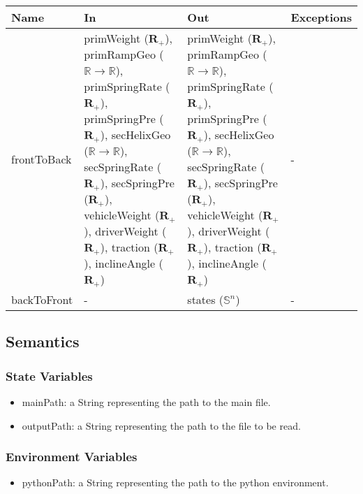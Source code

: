 \documentclass[12pt, titlepage]{article}
\begin{document}
\begin{center}
\begin{tabular}{p{2cm} p{4cm} p{4cm} p{2cm}}
\hline
\textbf{Name} & \textbf{In} & \textbf{Out} & \textbf{Exceptions} \\
\hline
frontToBack & primWeight ($\mathbf{R}_{+}$), primRampGeo ($\mathbb{R} \rightarrow \mathbb{R}$), primSpringRate ($\mathbf{R}_{+}$), primSpringPre ($\mathbf{R}_{+}$), secHelixGeo ($\mathbb{R} \rightarrow \mathbb{R}$), secSpringRate ($\mathbf{R}_{+}$), secSpringPre ($\mathbf{R}_{+}$), vehicleWeight ($\mathbf{R}_{+}$), driverWeight ($\mathbf{R}_{+}$), traction ($\mathbf{R}_{+}$), inclineAngle ($\mathbf{R}_{+}$) & primWeight ($\mathbf{R}_{+}$), primRampGeo ($\mathbb{R} \rightarrow \mathbb{R}$), primSpringRate ($\mathbf{R}_{+}$), primSpringPre ($\mathbf{R}_{+}$), secHelixGeo ($\mathbb{R} \rightarrow \mathbb{R}$), secSpringRate ($\mathbf{R}_{+}$), secSpringPre ($\mathbf{R}_{+}$), vehicleWeight ($\mathbf{R}_{+}$), driverWeight ($\mathbf{R}_{+}$), traction ($\mathbf{R}_{+}$), inclineAngle ($\mathbf{R}_{+}$) & - \\
backToFront & - & states ($\mathbb{S}^n$) & - \\
\hline
\end{tabular}
\end{center}

\subsection{Semantics}

\subsubsection{State Variables}

\begin{itemize}
  \item mainPath: a String representing the path to the main file.
  \item outputPath: a String representing the path to the file to be read.
\end{itemize}

\subsubsection{Environment Variables}

\begin{itemize}
  \item pythonPath: a String representing the path to the python environment.
\end{itemize}
\end{document}
